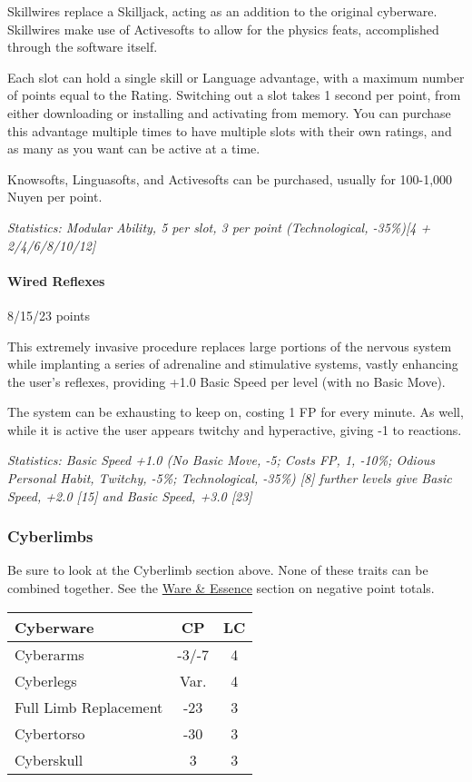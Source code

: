 \begin{multicols*}{3}
	Skillwires replace a Skilljack, acting as an addition to the original cyberware. Skillwires make use of Activesofts to allow for the physics feats, accomplished through the software itself. 
	
	Each slot can hold a single skill or Language advantage, with a maximum number of points equal to the Rating. Switching out a slot takes 1 second per point, from either downloading or installing and activating from memory. You can purchase this advantage multiple times to have multiple slots with their own ratings, and as many as you want can be active at a time.
	
	Knowsofts, Linguasofts, and Activesofts can be purchased, usually for 100-1,000 Nuyen per point.
	
	\textit{\textcolor{OliveGreen}{Statistics: Modular Ability, 5 per slot, 3 per point (Technological, -35\%)[4 + 2/4/6/8/10/12]}}
	
	\paragraph{Wired Reflexes}
	\begin{flushright}
		8/15/23 points
	\end{flushright}
	
	This extremely invasive procedure replaces large portions of the nervous system while implanting a series of adrenaline and stimulative systems, vastly enhancing the user's reflexes, providing +1.0 Basic Speed per level (with no Basic Move).
	
	The system can be exhausting to keep on, costing 1 FP for every minute. As well, while it is active the user appears twitchy and hyperactive, giving -1 to reactions.
	
	\textit{\textcolor{OliveGreen}{Statistics: Basic Speed +1.0 (No Basic Move, -5; Costs FP, 1, -10\%; Odious Personal Habit, Twitchy, -5\%; Technological, -35\%) [8] further levels give Basic Speed, +2.0 [15] and Basic Speed, +3.0 [23]}}
	
	\subsubsection{Cyberlimbs}
	
	Be sure to look at the Cyberlimb section above. None of these traits can be combined together. See the \hyperref[ware]{Ware \& Essence} section on negative point totals.
	
	\begin{center}
		\begin{tabularx}{0.32\textwidth}{|X|c|c|}
			\hline
			Cyberware & CP & LC\\
			\hline
			\hline
			Cyberarms & -3/-7 & 4 \\
			Cyberlegs & Var. & 4 \\
			Full Limb Replacement & -23 & 3 \\
			Cybertorso & -30 & 3 \\
			Cyberskull & 3 & 3 \\
			\hline
		\end{tabularx}
	\end{center}
	

\end{multicols*}
